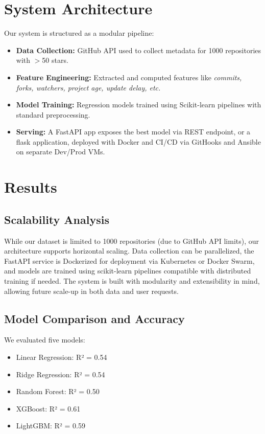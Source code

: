 \documentclass[12pt,a4paper]{article}
\begin{document}
\section{System Architecture}
Our system is structured as a modular pipeline:
\begin{itemize}
    \item \textbf{Data Collection:} GitHub API used to collect metadata for 1000 repositories with $>$50 stars.
    \item \textbf{Feature Engineering:} Extracted and computed features like \textit{commits, forks, watchers, project age, update delay, etc.}
    \item \textbf{Model Training:} Regression models trained using Scikit-learn pipelines with standard preprocessing.
    \item \textbf{Serving:} A FastAPI app exposes the best model via REST endpoint, or a flask application, deployed with Docker and CI/CD via GitHooks and Ansible on separate Dev/Prod VMs.
\end{itemize}

\section{Results}
\subsection{Scalability Analysis}
While our dataset is limited to 1000 repositories (due to GitHub API limits), our architecture supports horizontal scaling. Data collection can be parallelized, the FastAPI service is Dockerized for deployment via Kubernetes or Docker Swarm, and models are trained using scikit-learn pipelines compatible with distributed training if needed. The system is built with modularity and extensibility in mind, allowing future scale-up in both data and user requests.

\subsection{Model Comparison and Accuracy}
We evaluated five models:
\begin{itemize}[noitemsep]
    \item Linear Regression: R² = 0.54
    \item Ridge Regression: R² = 0.54
    \item Random Forest: R² = 0.50
    \item XGBoost: R² = 0.61
    \item LightGBM: R² = 0.59
\end{itemize}
\end{document}
